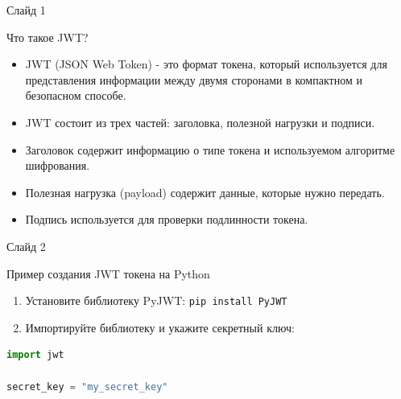 \documentclass[
  ignorenonframetext,
  aspectratio=169,
  aspectratio=169]{beamer}
\newcommand{\passthrough}[1]{#1}
\providecommand{\tightlist}{%
  \setlength{\itemsep}{0pt}\setlength{\parskip}{0pt}}
\begin{document}
\begin{frame}{Слайд 1}
\protect\hypertarget{ux441ux43bux430ux439ux434-1}{}
\begin{block}{Что такое JWT?}
\protect\hypertarget{ux447ux442ux43e-ux442ux430ux43aux43eux435-jwt}{}
\begin{itemize}
\tightlist
\item
  JWT (JSON Web Token) - это формат токена, который используется для
  представления информации между двумя сторонами в компактном и
  безопасном способе.
\item
  JWT состоит из трех частей: заголовка, полезной нагрузки и подписи.
\item
  Заголовок содержит информацию о типе токена и используемом алгоритме
  шифрования.
\item
  Полезная нагрузка (payload) содержит данные, которые нужно передать.
\item
  Подпись используется для проверки подлинности токена.
\end{itemize}
\end{block}
\end{frame}

\begin{frame}[fragile]{Слайд 2}
\protect\hypertarget{ux441ux43bux430ux439ux434-2}{}
\begin{block}{Пример создания JWT токена на Python}
\protect\hypertarget{ux43fux440ux438ux43cux435ux440-ux441ux43eux437ux434ux430ux43dux438ux44f-jwt-ux442ux43eux43aux435ux43dux430-ux43dux430-python}{}
\begin{enumerate}
\tightlist
\item
  Установите библиотеку PyJWT:
  \passthrough{\lstinline!pip install PyJWT!}
\item
  Импортируйте библиотеку и укажите секретный ключ:
\end{enumerate}

\begin{lstlisting}[language=Python]
import jwt

secret_key = "my_secret_key"
\end{lstlisting}
\end{block}
\end{frame}
\end{document}
